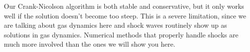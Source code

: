 Our Crank-Nicolson algorithm is both stable and conservative, but it only
works well if the solution doesn\rq t become too steep. This is a severe limitation,
since we are talking about gas dynamics here and shock waves routinely show up
as solutions in gas dynamics. Numerical methods that properly handle shocks
are much more involved than the ones we will show you here.
